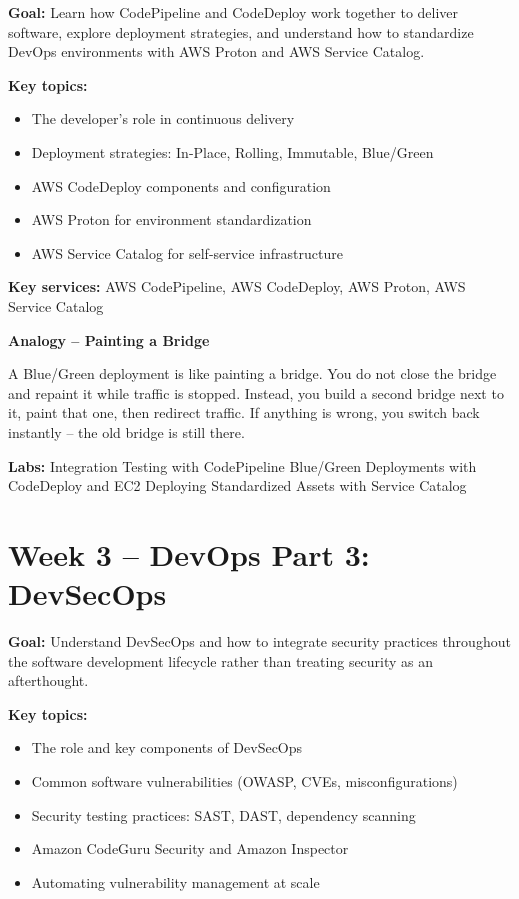 \documentclass[12pt,a4paper]{article}
\begin{document}
\textbf{Goal:} Learn how CodePipeline and CodeDeploy work together to deliver
software, explore deployment strategies, and understand how to standardize DevOps
environments with AWS Proton and AWS Service Catalog.

\textbf{Key topics:}
\begin{itemize}[leftmargin=1.5em]
  \item The developer's role in continuous delivery
  \item Deployment strategies: In-Place, Rolling, Immutable, Blue/Green
  \item AWS CodeDeploy components and configuration
  \item AWS Proton for environment standardization
  \item AWS Service Catalog for self-service infrastructure
\end{itemize}

\textbf{Key services:} AWS CodePipeline, AWS CodeDeploy, AWS Proton, AWS Service Catalog

\begin{analogybox}
\textbf{Analogy -- Painting a Bridge}

A Blue/Green deployment is like painting a bridge. You do not close the bridge and
repaint it while traffic is stopped. Instead, you build a second bridge next to it,
paint that one, then redirect traffic. If anything is wrong, you switch back
instantly -- the old bridge is still there.
\end{analogybox}

\textbf{Labs:} Integration Testing with CodePipeline \textbullet{}
Blue/Green Deployments with CodeDeploy and EC2 \textbullet{}
Deploying Standardized Assets with Service Catalog

\newpage

\section{Week 3 -- DevOps Part 3: DevSecOps}

\textbf{Goal:} Understand DevSecOps and how to integrate security practices
throughout the software development lifecycle rather than treating security as an
afterthought.

\textbf{Key topics:}
\begin{itemize}[leftmargin=1.5em]
  \item The role and key components of DevSecOps
  \item Common software vulnerabilities (OWASP, CVEs, misconfigurations)
  \item Security testing practices: SAST, DAST, dependency scanning
  \item Amazon CodeGuru Security and Amazon Inspector
  \item Automating vulnerability management at scale
\end{itemize}
\end{document}
